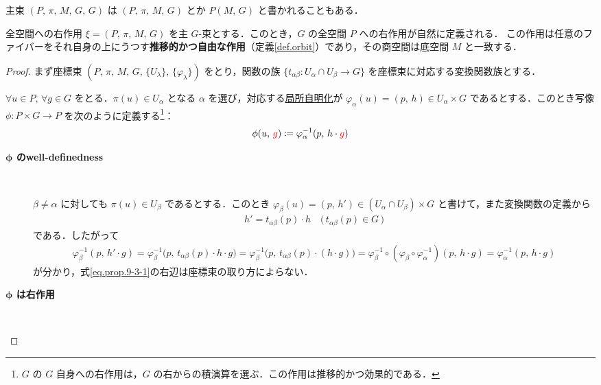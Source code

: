 \documentclass[geometry_main]{subfiles}
\begin{document}
主束 $(P,\, \pi,\, M,\, G,\, G)$ は $(P,\, \pi,\, M,\, G)$ とか $P(M,\, G)$ と書かれることもある．

\begin{myprop}[label=prop.PFD_right]{全空間への右作用}
	$\xi = (P,\, \pi,\, M,\, G)$ を主 $G$-束とする．このとき，$G$ の全空間 $P$ への右作用が自然に定義される．
	この作用は任意のファイバーをそれ自身の上にうつす\textbf{推移的かつ自由な作用}（定義\ref{def.orbit}）であり，その商空間は底空間 $M$ と一致する．
\end{myprop}

\begin{proof}
	まず座標束 $(P,\, \pi,\, M,\, G,\, \{U_\lambda \},\, \{\varphi_\lambda \})$ をとり，関数の族
	$\{t_{\alpha\beta} \colon U_\alpha \cap U_\beta \to G\}$ を座標束に対応する変換関数族とする．

	$\forall u \in P,\, \forall g \in G$ をとる．$\pi(u) \in U_\alpha$ となる $\alpha$ を選び，対応する\hyperref[def.fiber-1]{局所自明化}が $\varphi_\alpha (u) = (p,\, h) \in U_\alpha \times G$ であるとする．このとき写像 $\phi \colon P \times G \to P$ を次のように定義する\footnote{$G$ の $G$ 自身への右作用は，$G$ の右からの積演算を選ぶ．この作用は推移的かつ効果的である．}：
	\begin{align}
		\label{eq.prop.9-3-1}
		\phi(u,\, \textcolor{red}{g}) \coloneqq \varphi_\alpha^{-1}(p,\, h \cdot \textcolor{red}{g})
	\end{align}
	
	\begin{description}
		\item[\textbf{$\bm{\phi}$ のwell-definedness}]　
		
			$\beta \neq \alpha$ に対しても $\pi(u) \in U_\beta$ であるとする．このとき $\varphi_\beta(u) = (p,\, h') \in (U_\alpha \cap U_\beta) \times G$ と書けて，また変換関数の定義から
			\begin{align}
				h' = t_{\alpha\beta}(p) \cdot h \quad \bigl(\, t_{\alpha\beta}(p) \in G\, \bigr)
			\end{align}
			である．したがって
			\begin{align}
				\varphi_\beta^{-1}(p,\, h' \cdot g) = \varphi_\beta^{-1}\bigl(p,\, t_{\alpha\beta}(p) \cdot h \cdot g\bigr) = \varphi_\beta^{-1}\bigl(p,\, t_{\alpha\beta}(p) \cdot (h \cdot g) \bigr) = \varphi_\beta^{-1} \circ (\varphi_\beta \circ \varphi_\alpha^{-1})(p,\, h \cdot g) = \varphi_\alpha^{-1}(p,\, h \cdot g)
			\end{align}
			が分かり，式\eqref{eq.prop.9-3-1}の右辺は座標束の取り方によらない．
		\item[\textbf{$\bm{\phi}$ は右作用}]　
		

\end{description}
\end{proof}
\end{document}
